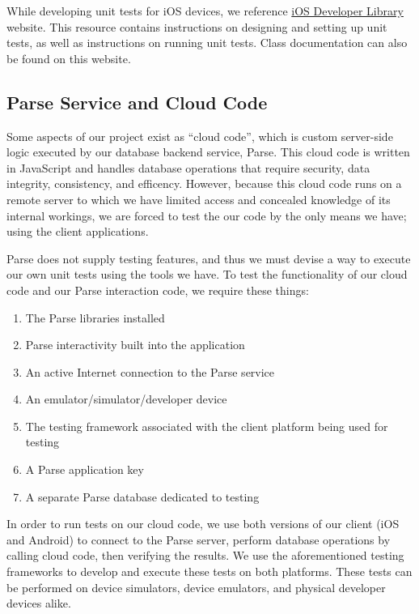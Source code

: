 While developing unit tests for iOS devices, we reference \href{https://developer.apple.com/library/ios/documentation/ToolsLanguages/Conceptual/Xcode_Overview/UnitTesting.html}
{iOS Developer Library} website. This resource contains instructions on
designing and setting up unit tests, as well as instructions on running unit
tests. Class documentation can also be found on this website.


\subsection{Parse Service and Cloud Code}

Some aspects of our project exist as ``cloud code'', which is custom server-side
logic executed by our database backend service, Parse. This cloud code is
written in JavaScript and handles database operations that require security,
data integrity, consistency, and efficency. However, because this cloud code
runs on a remote server to which we have limited access and concealed knowledge
of its internal workings, we are forced to test the our code by the only means
we have; using the client applications.

Parse does not supply testing features, and thus we must devise a way to execute
our own unit tests using the tools we have. To test the functionality of our
cloud code and our Parse interaction code, we require these things:

\begin{enumerate}
	\item The Parse libraries installed
	\item Parse interactivity built into the application
	\item An active Internet connection to the Parse service
	\item An emulator/simulator/developer device
	\item The testing framework associated with the client platform being used
	for testing
	\item A Parse application key
	\item A separate Parse database dedicated to testing
\end{enumerate}

In order to run tests on our cloud code, we use both versions of our client (iOS
and Android) to connect to the Parse server, perform database operations by
calling cloud code, then verifying the results. We use the aforementioned
testing frameworks to develop and execute these tests on both platforms. These
tests can be performed on device simulators, device emulators, and physical
developer devices alike.

